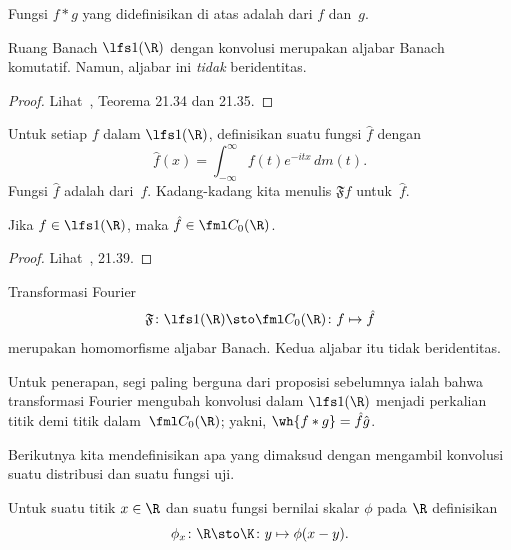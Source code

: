 \begin{defn} Fungsi $f \ast g$ yang didefinisikan di atas adalah
 dari $f$ dan~$g$.
\end{defn}

\begin{prop} Ruang Banach $\lfs 1(\R)$ dengan konvolusi merupakan aljabar Banach komutatif. Namun, aljabar ini \emph{tidak} beridentitas.
\end{prop}

\begin{proof} Lihat~\cite{HewittS:1965}, Teorema 21.34 dan 21.35.  \ns
\end{proof}

\begin{defn}\label{defn_Fourier_transform} Untuk setiap $f$ dalam $\lfs 1(\R)$, definisikan suatu fungsi $\hat f$ dengan
    \[ \hat f(x) = \int_{-\infty}^\infty f(t) e^{-itx}\,dm(t). \]
Fungsi $\hat f$ adalah
 dari~$f$. Kadang-kadang kita menulis $\mathfrak Ff$ untuk~$\hat f$.
\end{defn}

\begin{thm} Jika $f \in \lfs 1(\R)$,
maka $\hat f \in \fml C_0(\R)$.
\end{thm}

\begin{proof} Lihat~\cite{HewittS:1965}, 21.39.   \ns
\end{proof}

\begin{prop} Transformasi Fourier
   \[ \mathfrak F\colon \lfs 1(\R) \sto \fml C_0(\R)\colon f \mapsto \hat f \]
merupakan homomorfisme aljabar Banach. Kedua aljabar itu tidak beridentitas.
\end{prop}

Untuk penerapan, segi paling berguna dari proposisi sebelumnya ialah bahwa transformasi Fourier
mengubah konvolusi dalam $\lfs 1(\R)$ menjadi
perkalian titik demi titik dalam~$\fml C_0(\R)$; yakni, $\wh{f\ast g} =\hat f\hat g$.

Berikutnya kita mendefinisikan apa yang dimaksud dengan mengambil konvolusi suatu distribusi dan suatu fungsi uji.

\begin{notn} Untuk suatu titik $x \in \R$ dan suatu fungsi bernilai skalar $\phi$ pada $\R$
definisikan
   \[ \phi_x\colon \R \sto \K\colon y \mapsto \phi(x - y). \]
\end{notn}

